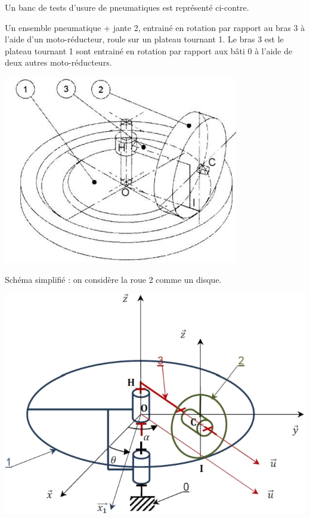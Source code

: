 \documentclass[10pt]{article}
\begin{document}
\begin{minipage}[c]{.7\linewidth}
Un banc de tests d’usure de pneumatiques est représenté ci-contre. 
 
Un ensemble pneumatique + jante 2, entrainé en rotation par rapport 
au bras 3 à l’aide d’un moto-réducteur, roule sur un plateau tournant 
1. 
Le bras 3 est le plateau tournant 1 sont entrainé en rotation par rapport 
aux bâti 0 à l’aide de deux autres moto-réducteurs.
\end{minipage}
\begin{minipage}[c]{.25\linewidth}
\begin{center}
\includegraphics[width=\textwidth]{images/fig_06}
\end{center}
\end{minipage}


Schéma simplifié : on considère la roue 2 comme un disque. 

\begin{center}
\includegraphics[width=.75\textwidth]{images/fig_07}
\end{center}
\end{document}

